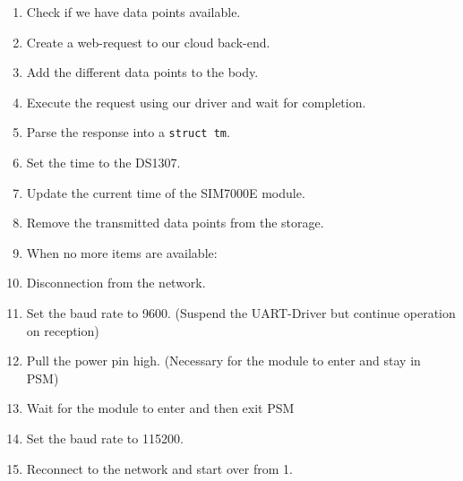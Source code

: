\begin{enumerate}
    \item Check if we have data points available.
    \item Create a web-request to our cloud back-end.
    \item Add the different data points to the body.
    \item Execute the request using our driver and wait for completion.
    \item Parse the response into a \verb|struct tm|.
    \item Set the time to the DS1307.
    \item Update the current time of the SIM7000E module.
    \item Remove the transmitted data points from the storage.
    \item When no more items are available:
    \item Disconnection from the network.
    \item Set the baud rate to 9600. (Suspend the UART-Driver but continue operation on reception)
    \item Pull the power pin high. (Necessary for the module to enter and stay in PSM)
    \item Wait for the module to enter and then exit PSM
    \item Set the baud rate to 115200.
    \item Reconnect to the network and start over from 1.
\end{enumerate}

